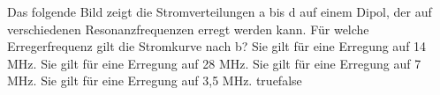     {Das folgende Bild zeigt die Stromverteilungen a bis d auf einem Dipol, der auf verschiedenen Resonanzfrequenzen erregt werden kann. Für welche Erregerfrequenz gilt die Stromkurve nach b?}
    {Sie gilt für eine Erregung auf 14 MHz.}
    {Sie gilt für eine Erregung auf 28 MHz.}
    {Sie gilt für eine Erregung auf 7 MHz.}
    {Sie gilt für eine Erregung auf 3,5 MHz.}
    {true}{false}